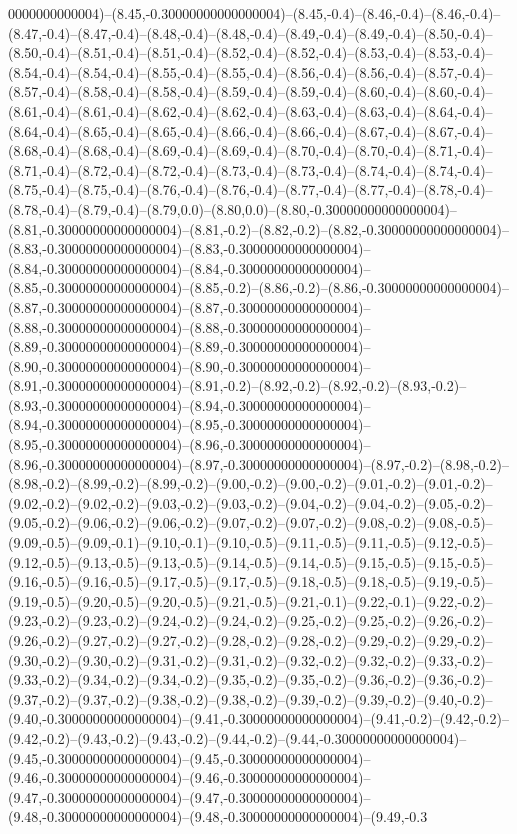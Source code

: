 0000000000004)--(8.45,-0.30000000000000004)--(8.45,-0.4)--(8.46,-0.4)--(8.46,-0.4)--(8.47,-0.4)--(8.47,-0.4)--(8.48,-0.4)--(8.48,-0.4)--(8.49,-0.4)--(8.49,-0.4)--(8.50,-0.4)--(8.50,-0.4)--(8.51,-0.4)--(8.51,-0.4)--(8.52,-0.4)--(8.52,-0.4)--(8.53,-0.4)--(8.53,-0.4)--(8.54,-0.4)--(8.54,-0.4)--(8.55,-0.4)--(8.55,-0.4)--(8.56,-0.4)--(8.56,-0.4)--(8.57,-0.4)--(8.57,-0.4)--(8.58,-0.4)--(8.58,-0.4)--(8.59,-0.4)--(8.59,-0.4)--(8.60,-0.4)--(8.60,-0.4)--(8.61,-0.4)--(8.61,-0.4)--(8.62,-0.4)--(8.62,-0.4)--(8.63,-0.4)--(8.63,-0.4)--(8.64,-0.4)--(8.64,-0.4)--(8.65,-0.4)--(8.65,-0.4)--(8.66,-0.4)--(8.66,-0.4)--(8.67,-0.4)--(8.67,-0.4)--(8.68,-0.4)--(8.68,-0.4)--(8.69,-0.4)--(8.69,-0.4)--(8.70,-0.4)--(8.70,-0.4)--(8.71,-0.4)--(8.71,-0.4)--(8.72,-0.4)--(8.72,-0.4)--(8.73,-0.4)--(8.73,-0.4)--(8.74,-0.4)--(8.74,-0.4)--(8.75,-0.4)--(8.75,-0.4)--(8.76,-0.4)--(8.76,-0.4)--(8.77,-0.4)--(8.77,-0.4)--(8.78,-0.4)--(8.78,-0.4)--(8.79,-0.4)--(8.79,0.0)--(8.80,0.0)--(8.80,-0.30000000000000004)--(8.81,-0.30000000000000004)--(8.81,-0.2)--(8.82,-0.2)--(8.82,-0.30000000000000004)--(8.83,-0.30000000000000004)--(8.83,-0.30000000000000004)--(8.84,-0.30000000000000004)--(8.84,-0.30000000000000004)--(8.85,-0.30000000000000004)--(8.85,-0.2)--(8.86,-0.2)--(8.86,-0.30000000000000004)--(8.87,-0.30000000000000004)--(8.87,-0.30000000000000004)--(8.88,-0.30000000000000004)--(8.88,-0.30000000000000004)--(8.89,-0.30000000000000004)--(8.89,-0.30000000000000004)--(8.90,-0.30000000000000004)--(8.90,-0.30000000000000004)--(8.91,-0.30000000000000004)--(8.91,-0.2)--(8.92,-0.2)--(8.92,-0.2)--(8.93,-0.2)--(8.93,-0.30000000000000004)--(8.94,-0.30000000000000004)--(8.94,-0.30000000000000004)--(8.95,-0.30000000000000004)--(8.95,-0.30000000000000004)--(8.96,-0.30000000000000004)--(8.96,-0.30000000000000004)--(8.97,-0.30000000000000004)--(8.97,-0.2)--(8.98,-0.2)--(8.98,-0.2)--(8.99,-0.2)--(8.99,-0.2)--(9.00,-0.2)--(9.00,-0.2)--(9.01,-0.2)--(9.01,-0.2)--(9.02,-0.2)--(9.02,-0.2)--(9.03,-0.2)--(9.03,-0.2)--(9.04,-0.2)--(9.04,-0.2)--(9.05,-0.2)--(9.05,-0.2)--(9.06,-0.2)--(9.06,-0.2)--(9.07,-0.2)--(9.07,-0.2)--(9.08,-0.2)--(9.08,-0.5)--(9.09,-0.5)--(9.09,-0.1)--(9.10,-0.1)--(9.10,-0.5)--(9.11,-0.5)--(9.11,-0.5)--(9.12,-0.5)--(9.12,-0.5)--(9.13,-0.5)--(9.13,-0.5)--(9.14,-0.5)--(9.14,-0.5)--(9.15,-0.5)--(9.15,-0.5)--(9.16,-0.5)--(9.16,-0.5)--(9.17,-0.5)--(9.17,-0.5)--(9.18,-0.5)--(9.18,-0.5)--(9.19,-0.5)--(9.19,-0.5)--(9.20,-0.5)--(9.20,-0.5)--(9.21,-0.5)--(9.21,-0.1)--(9.22,-0.1)--(9.22,-0.2)--(9.23,-0.2)--(9.23,-0.2)--(9.24,-0.2)--(9.24,-0.2)--(9.25,-0.2)--(9.25,-0.2)--(9.26,-0.2)--(9.26,-0.2)--(9.27,-0.2)--(9.27,-0.2)--(9.28,-0.2)--(9.28,-0.2)--(9.29,-0.2)--(9.29,-0.2)--(9.30,-0.2)--(9.30,-0.2)--(9.31,-0.2)--(9.31,-0.2)--(9.32,-0.2)--(9.32,-0.2)--(9.33,-0.2)--(9.33,-0.2)--(9.34,-0.2)--(9.34,-0.2)--(9.35,-0.2)--(9.35,-0.2)--(9.36,-0.2)--(9.36,-0.2)--(9.37,-0.2)--(9.37,-0.2)--(9.38,-0.2)--(9.38,-0.2)--(9.39,-0.2)--(9.39,-0.2)--(9.40,-0.2)--(9.40,-0.30000000000000004)--(9.41,-0.30000000000000004)--(9.41,-0.2)--(9.42,-0.2)--(9.42,-0.2)--(9.43,-0.2)--(9.43,-0.2)--(9.44,-0.2)--(9.44,-0.30000000000000004)--(9.45,-0.30000000000000004)--(9.45,-0.30000000000000004)--(9.46,-0.30000000000000004)--(9.46,-0.30000000000000004)--(9.47,-0.30000000000000004)--(9.47,-0.30000000000000004)--(9.48,-0.30000000000000004)--(9.48,-0.30000000000000004)--(9.49,-0.3